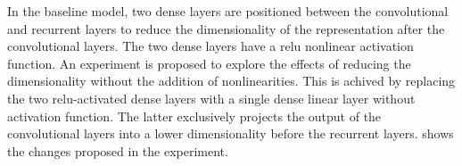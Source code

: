 
In the baseline model, two dense layers are positioned
between the convolutional and recurrent layers to reduce the
dimensionality of the representation after the convolutional
layers. The two dense layers have a \gls{relu} nonlinear
activation function. An experiment is proposed to explore
the effects of reducing the dimensionality without the
addition of nonlinearities. This is achived by replacing the
two \gls{relu}-activated dense layers with a single dense
linear layer without activation function. The latter
exclusively projects the output of the convolutional layers
into a lower dimensionality before the recurrent layers.
 shows the changes proposed in the
experiment. 

